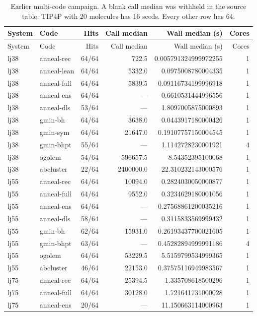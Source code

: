 \begin{longtable}{llrrrr}
\caption{Earlier multi-code campaign. A blank call median was withheld in the source table. TIP4P with 20 molecules has 16 seeds. Every other row has 64.\label{tab:campaign}}\\
\toprule
System & Code & Hits & Call median & Wall median (s) & Cores \\
\midrule\endfirsthead
\toprule System & Code & Hits & Call median & Wall median (s) & Cores \\
\midrule\endhead
\bottomrule\endlastfoot
lj38 & anneal-rec & 64/64 & 722.5 & 0.005791324999972255 & 1\\
lj38 & anneal-lean & 64/64 & 5332.0 & 0.0975008780004335 & 1\\
lj38 & anneal-full & 64/64 & 5839.5 & 0.09116734199996918 & 1\\
lj38 & anneal-ens & 64/64 & --- & 0.6610531444996556 & 1\\
lj38 & anneal-dls & 53/64 & --- & 1.8097005875000893 & 1\\
lj38 & gmin-bh & 64/64 & 3638.0 & 0.0443917180000426 & 1\\
lj38 & gmin-sym & 64/64 & 21647.0 & 0.19107757150004545 & 1\\
lj38 & gmin-bhpt & 55/64 & --- & 1.1142728230001921 & 4\\
lj38 & ogolem & 54/64 & 596657.5 & 8.54352395100068 & 1\\
lj38 & abcluster & 22/64 & 2400000.0 & 22.310232143000576 & 1\\
lj55 & anneal-rec & 64/64 & 10094.0 & 0.2824030050000877 & 1\\
lj55 & anneal-full & 64/64 & 9552.0 & 0.3234629180001056 & 1\\
lj55 & anneal-ens & 64/64 & --- & 0.27568861200035216 & 1\\
lj55 & anneal-dls & 58/64 & --- & 0.3115833569999432 & 1\\
lj55 & gmin-bh & 62/64 & 15931.0 & 0.26193437700021605 & 1\\
lj55 & gmin-bhpt & 63/64 & --- & 0.45282894999991186 & 4\\
lj55 & ogolem & 64/64 & 53229.5 & 5.5159799534999365 & 1\\
lj55 & abcluster & 46/64 & 22153.0 & 0.37575116949983567 & 1\\
lj75 & anneal-rec & 64/64 & 25394.5 & 1.335708618500296 & 1\\
lj75 & anneal-full & 64/64 & 30128.0 & 1.721641731000028 & 1\\
lj75 & anneal-ens & 20/64 & --- & 11.150663114000963 & 1\\

\end{longtable}
